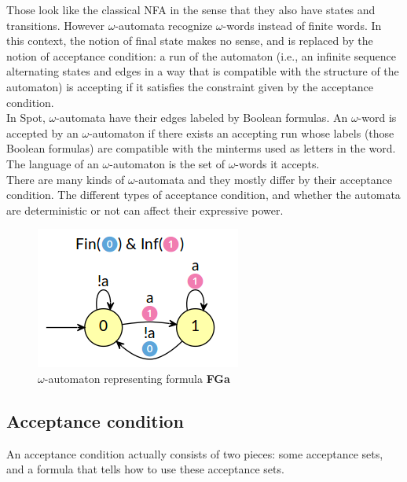 Those look like the classical NFA in the sense that they also have states and transitions. However
$\omega$-automata recognize $\omega$-words instead of finite words. In this context, the notion of final
state makes no sense, and is replaced by the notion of acceptance condition: a run of the automaton
(i.e., an infinite sequence alternating states and edges in a way that is compatible with the structure of
the automaton) is accepting if it satisfies the constraint given by the acceptance condition.\\

In Spot, $\omega$-automata have their edges labeled by Boolean formulas. An $\omega$-word is accepted by an
$\omega$-automaton if there exists an accepting run whose labels (those Boolean formulas) are compatible
with the minterms \cite{11} used as letters in the word.\\

The language of an $\omega$-automaton is the set of $\omega$-words it accepts.\\

There are many kinds of $\omega$-automata and they mostly differ by their acceptance condition. The
different types of acceptance condition, and whether the automata are deterministic or not can affect their
expressive power.

\begin{figure}[H]
 \centering
 \includegraphics[scale=0.8]{img/omega_aut.png}
 \caption{$\omega$-automaton representing formula \textbf{FGa}}
 \label{fig:aut_classes}
\end{figure}

\subsection{Acceptance condition}
An acceptance condition actually consists of two pieces: some acceptance sets, and a formula that tells
how to use these acceptance sets.\\

